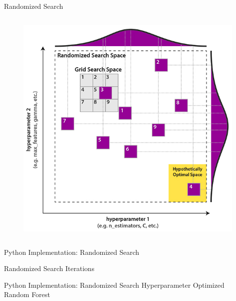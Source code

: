 \documentclass[document.tex]{subfiles}
\begin{document}
\begin{frame}{Randomized Search}
\begin{columns}
\begin{column}{.4\textwidth}
\begin{figure}
                    \includegraphics[width=\textwidth, cframe=gray]{figures/external/hyperparameter-tuning-matrix.jpg}
                \end{figure}
            \end{column}
        \end{columns}
    \end{frame}

    \begin{frame}{Python Implementation: Randomized Search}
        
    \end{frame}

    \begin{frame}{Randomized Search Iterations}
        
    \end{frame}

    \begin{frame}{Python Implementation: Randomized Search Hyperparameter Optimized Random Forest}
        
    \end{frame}
\end{document}
